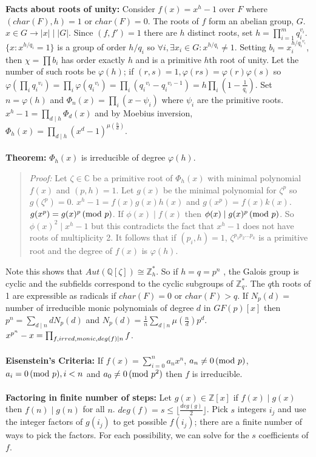 {\bf Facts about roots of unity:}  
Consider $f(x)= x^h -1$ over $F$ where 
$(char(F),h)=1$ or $char(F)=0$.
The roots of $f$ form an abelian group, $G$.  $x \in G \rightarrow |x| \mid |G|$.  Since
$(f, f')=1$ there are $h$ distinct roots, set $h= \prod_{i=1}^m q_i^{v_i}$.  
$\{ x: x^{h/q_i} = 1 \}$ is a group of order
$h/q_i$ so $\forall i, \exists x_i \in G: 
x^{h/q_i} \ne 1$.  Setting $b_i= x_i^{h/{q_i}^{v_i}}$, then $\chi = \prod b_i$ has order
exactly $h$ and is a primitive $h$th root of unity.  
Let the number of such roots be $\varphi(h)$; if $(r,s)=1, \varphi(rs)= \varphi(r) \varphi(s)$
so $\varphi(\prod_i {q_i}^{v_i})= 
\prod_i \varphi({q_i}^{v_i})= 
\prod_i ({q_i}^{v_i}- {q_i}^{v_i-1})= h \prod_i (1- {\frac 1 {q_i}})$.  Set $n=\varphi(h)$ and
$\Phi_n(x) = \prod_i (x- \psi_i)$ where $\psi_i$ are the primitive roots.
$x^h-1 = \prod_{d \mid h} \Phi_d(x)$ and by Moebius inversion,
$\Phi_h(x)= \prod_{d \mid h} (x^d -1)^{\mu({\frac h d})}$.
\\
\\
{\bf Theorem:} $\Phi_h(x)$ is irreducible of
degree $\varphi(h)$.
\begin{quote}
\emph{Proof:} Let $\zeta \in {\mathbb C}$ be a primitive root of
$\Phi_h(x)$ with minimal polynomial $f(x)$ and $(p,h)=1$.  Let $g(x)$ be the minimal
polynomial for $\zeta^p$ so $g(\zeta^p)=0$.  $x^h -1 = f(x) g(x) h(x)$ and
$g(x^p)=f(x)k(x)$.  $g(x^p)=g(x)^p \thinspace \textnormal{(mod } p \textnormal{)}$.  If $\phi(x) \mid f(x)$ then
$\phi(x) \mid g(x)^p \thinspace \textnormal{(mod } p \textnormal{)}$.  So $\phi(x)^2 \mid x^h-1$ but this contradicts the
fact that $x^h -1$ does not have roots of multiplicity 2.  It follows that if $(p_i , h)=1$,
$\zeta^{p_1 p_2 \ldots p_k}$ is a primitive root and the degree of $f(x)$ is $\varphi(h)$.
\end{quote}
Note this shows that $Aut({\mathbb Q}[\zeta]) \cong {\mathbb Z}_h^*$.
So if $h=q=p^n$ ,
the Galois group is cyclic and the subfields correspond to the
cyclic subgroups of ${\mathbb Z}_q^*$.  The $q$th roots of 1 are expressible as radicals
if $char(F)=0$ or $char(F)>q$.
If $N_p (d)=$ number of irreducible monic polynomials of degree $d$ in
$GF(p)[x]$ then $p^n = \sum_{d \mid n} d N_p (d)$ and $N_p (d)= {\frac 1 n}
\sum_{d \mid n} \mu ( {\frac {n} {d} }) p^d$.
$x^{p^n} - x = \prod_{f,\small{irred, monic}, deg(f) \mid n} f$.
\\
\\
{\bf Eisenstein's Criteria:} If $f(x)= \sum_{i=0}^n a_n x^n$, $a_n \ne 0 \thinspace \textnormal{(mod } p \textnormal{)}$,
$a_i = 0 \thinspace \textnormal{(mod } p \textnormal{)}, i<n$ and $a_0 \ne 0 \thinspace \textnormal{(mod } p^2 \textnormal{)}$ then $f$ is irreducible.
\\
\\
{\bf Factoring in finite number of steps:} Let $g(x) \in {\mathbb Z}[x]$ if
$f(x) \mid g(x)$ then $f(n) \mid g(n)$ for
all $n$. $deg(f) = s \le \lfloor {\frac {deg(g)} 2} \rfloor$.  Pick $s$ integers $i_j$ and
use the integer factors of $g(i_j)$ to get possible $f(i_j)$; there are a finite
number of ways to pick the factors.  For each possibility, we can solve for the $s$ 
coefficients of $f$.
